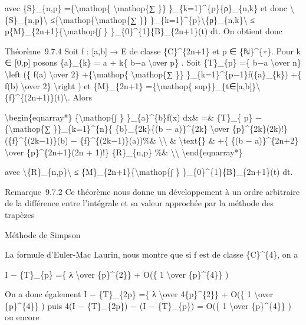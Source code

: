 \documentclass[]{article}
\begin{document}
avec \{S\}\_\{n,p\} =\{\textbackslash{}mathop\{
\textbackslash{}mathop\{∑ \}\} \}\_\{k=1\}\^{}\{p\}\{ρ\}\_\{n,k\} et
donc \textbackslash{}\textbar{}\{S\}\_\{n,p\}\textbackslash{}\textbar{}
≤\{\textbackslash{}mathop\{\textbackslash{}mathop\{∑ \}\}
\}\_\{k=1\}\^{}\{p\}\textbackslash{}\textbar{}\{ρ\}\_\{n,k\}\textbackslash{}\textbar{}
≤ p\{M\}\_\{2n+1\}\{\textbackslash{}mathop\{∫ \}
\}\_\{0\}\^{}\{1\}\textbar{}\{B\}\_\{2n+1\}(t)\textbar{} dt. On obtient
donc

Théorème~9.7.4 Soit f : {[}a,b{]} → E de classe \{C\}\^{}\{2n+1\} et p ∈
\{ℕ\}\^{}\{∗\}. Pour k ∈ {[}0,p{]} posons \{a\}\_\{k\} = a + k\{ b−a
\textbackslash{}over p\} . Soit \{T\}\_\{p\} =\{ b−a
\textbackslash{}over n\} \textbackslash{}left (\{ f(a)
\textbackslash{}over 2\} +\{\textbackslash{}mathop\{
\textbackslash{}mathop\{∑ \}\} \}\_\{k=1\}\^{}\{p−1\}f(\{a\}\_\{k\}) +\{
f(b) \textbackslash{}over 2\} \textbackslash{}right ) et \{M\}\_\{2n+1\}
=\{\textbackslash{}mathop\{
sup\}\}\_\{t∈{[}a,b{]}\}\textbackslash{}\textbar{}\{f\}\^{}\{(2n+1)\}(t)\textbackslash{}\textbar{}.
Alors

\textbackslash{}begin\{eqnarray*\} \{\textbackslash{}mathop\{∫ \}
\}\_\{a\}\^{}\{b\}f(x) dx\& =\& \{T\}\_\{ p\}
−\{\textbackslash{}mathop\{∑ \}\}\_\{k=1\}\^{}\{n\}\{ \{b\}\_\{2k\}\{(b
− a)\}\^{}\{2k\} \textbackslash{}over \{p\}\^{}\{2k\}(2k)!\}
(\{f\}\^{}\{(2k−1)\}(b) − \{f\}\^{}\{(2k−1)\}(a))\%\&
\textbackslash{}\textbackslash{} \& \textbackslash{}text\{\} \& +\{ \{(b
− a)\}\^{}\{2n+2\} \textbackslash{}over \{p\}\^{}\{2n+1\}(2n + 1)!\}
\{R\}\_\{n,p\} \%\& \textbackslash{}\textbackslash{}
\textbackslash{}end\{eqnarray*\}

avec \textbackslash{}\textbar{}\{R\}\_\{n,p\}\textbackslash{}\textbar{}
≤ \{M\}\_\{2n+1\}\{\textbackslash{}mathop\{∫ \}
\}\_\{0\}\^{}\{1\}\textbar{}\{B\}\_\{2n+1\}(t)\textbar{} dt.

Remarque~9.7.2 Ce théorème nous donne un développement à un ordre
arbitraire de la différence entre l'intégrale et sa valeur approchée par
la méthode des trapèzes

Méthode de Simpson

La formule d'Euler-Mac Laurin, nous montre que si f est de classe
\{C\}\^{}\{4\}, on a

I − \{T\}\_\{p\} =\{ λ \textbackslash{}over \{p\}\^{}\{2\}\} + O(\{ 1
\textbackslash{}over \{p\}\^{}\{4\}\} )

On a donc également I − \{T\}\_\{2p\} =\{ λ \textbackslash{}over
4\{p\}\^{}\{2\}\} + O(\{ 1 \textbackslash{}over \{p\}\^{}\{4\}\} ) puis
4(I − \{T\}\_\{2p\}) − (I − \{T\}\_\{p\}) = O(\{ 1 \textbackslash{}over
\{p\}\^{}\{4\}\} ) ou encore
\end{document}
